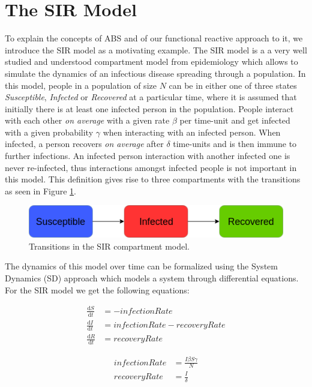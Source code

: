\section{The SIR Model}
To explain the concepts of ABS and of our functional reactive approach to it, we introduce the SIR model as a motivating example. The SIR model is a a very well studied and understood compartment model from epidemiology which allows to simulate the dynamics of an infectious disease spreading through a population. In this model, people in a population of size $N$ can be in either one of three states \textit{Susceptible}, \textit{Infected} or \textit{Recovered} at a particular time, where it is assumed that initially there is at least one infected person in the population. People interact with each other \textit{on average} with a given rate $\beta$ per time-unit and get infected with a given probability $\gamma$ when interacting with an infected person. When infected, a person recovers \textit{on average} after $\delta$ time-units and is then immune to further infections. An infected person interaction with another infected one is never re-infected, thus interactions amongst infected people is not important in this model. This definition gives rise to three compartments with the transitions as seen in Figure \ref{fig:sir_transitions}.

\begin{figure}
	\centering
	\includegraphics[width=.4\textwidth, angle=0]{./../shared/fig/SIR_transitions.png}
	\caption{Transitions in the SIR compartment model.}
	\label{fig:sir_transitions}
\end{figure}

The dynamics of this model over time can be formalized using the System Dynamics (SD) approach which models a system through differential equations. For the SIR model we get the following equations:

\begin{align*}
\frac{\mathrm d S}{\mathrm d t} &= -infectionRate \\ 
\frac{\mathrm d I}{\mathrm d t} &= infectionRate - recoveryRate \\ 
\frac{\mathrm d R}{\mathrm d t} &= recoveryRate 
\end{align*}

\begin{align*}
infectionRate &= \frac{I \beta S \gamma}{N} \\
recoveryRate &= \frac{I}{\delta} 
\end{align*}

